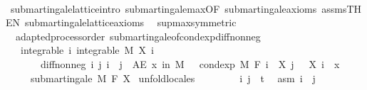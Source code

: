 \begin{isabellebody}
%
\isadelimproof
\ \ %
\endisadelimproof
%
\isatagproof
{}\isamarkupfalse%
\ submartingale{\isacharunderscore}{\kern0pt}lattice{\isachardot}{\kern0pt}intro\ submartingale{\isachardot}{\kern0pt}max{\isacharbrackleft}{\kern0pt}OF\ submartingale{\isacharunderscore}{\kern0pt}axioms\ assms{\isacharbrackleft}{\kern0pt}THEN\ submartingale{\isacharunderscore}{\kern0pt}lattice{\isachardot}{\kern0pt}axioms{\isacharbrackright}{\kern0pt}{\isacharbrackright}{\kern0pt}\ \isamarkupfalse%
\ sup{\isacharunderscore}{\kern0pt}max{\isacharbrackleft}{\kern0pt}symmetric{\isacharbrackright}{\kern0pt}\ \isacommand{{\isachardot}{\kern0pt}}\isamarkupfalse%
%
\endisatagproof
{\isafoldproof}%
%
\isadelimproof
\isanewline
%
\endisadelimproof
\isanewline
{}\isamarkupfalse%
\ {\isacharparenleft}{\kern0pt}\ adapted{\isacharunderscore}{\kern0pt}process{\isacharunderscore}{\kern0pt}order{\isacharparenright}{\kern0pt}\ submartingale{\isacharunderscore}{\kern0pt}of{\isacharunderscore}{\kern0pt}cond{\isacharunderscore}{\kern0pt}exp{\isacharunderscore}{\kern0pt}diff{\isacharunderscore}{\kern0pt}nonneg{\isacharcolon}{\kern0pt}\isanewline
\ \ \ integrable{\isacharcolon}{\kern0pt}\ {\isachardoublequoteopen}{\isasymAnd}i{\isachardot}{\kern0pt}\ integrable\ M\ {\isacharparenleft}{\kern0pt}X\ i{\isacharparenright}{\kern0pt}{\isachardoublequoteclose}\ \isanewline
\ \ \ \ \ \ \ diff{\isacharunderscore}{\kern0pt}nonneg{\isacharcolon}{\kern0pt}\ {\isachardoublequoteopen}{\isasymAnd}i\ j{\isachardot}{\kern0pt}\ i\ {\isasymle}\ j\ {\isasymLongrightarrow}\ AE\ x\ in\ M{\isachardot}{\kern0pt}\ {}\ {\isasymle}\ cond{\isacharunderscore}{\kern0pt}exp\ M\ {\isacharparenleft}{\kern0pt}F\ i{\isacharparenright}{\kern0pt}\ {\isacharparenleft}{\kern0pt}{\isasymlambda}{\isasymxi}{\isachardot}{\kern0pt}\ X\ j\ {\isasymxi}\ {\isacharminus}{\kern0pt}\ X\ i\ {\isasymxi}{\isacharparenright}{\kern0pt}\ x{\isachardoublequoteclose}\isanewline
\ \ \ \ \ {\isachardoublequoteopen}submartingale\ M\ F\ X{\isachardoublequoteclose}\isanewline
%
\isadelimproof
%
\endisadelimproof
%
\isatagproof
{}\isamarkupfalse%
\ {\isacharparenleft}{\kern0pt}unfold{\isacharunderscore}{\kern0pt}locales{\isacharparenright}{\kern0pt}\isanewline
\ \ \isacommand{{\isacharbraceleft}{\kern0pt}}\isamarkupfalse%
\isanewline
\ \ \ \ \isamarkupfalse%
\ i\ j\ {\isacharcolon}{\kern0pt}{\isacharcolon}{\kern0pt}\ {\isacharprime}{\kern0pt}t\ \isamarkupfalse%
\ asm{\isacharcolon}{\kern0pt}\ {\isachardoublequoteopen}i\ {\isasymle}\ j{\isachardoublequoteclose}\isanewline

\end{isabellebody}
